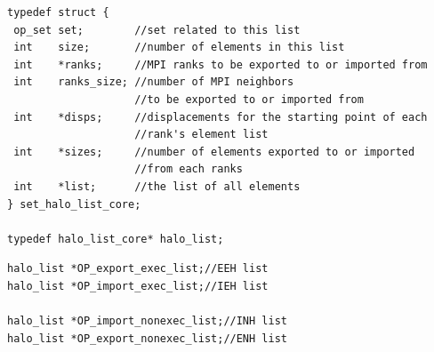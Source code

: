 \documentclass[11pt]{article}
\begin{document}
\begin{verbatim}
typedef struct {
 op_set set;        //set related to this list
 int    size;       //number of elements in this list
 int    *ranks;     //MPI ranks to be exported to or imported from
 int    ranks_size; //number of MPI neighbors
                    //to be exported to or imported from
 int    *disps;     //displacements for the starting point of each
                    //rank's element list
 int    *sizes;     //number of elements exported to or imported
                    //from each ranks
 int    *list;      //the list of all elements
} set_halo_list_core;

typedef halo_list_core* halo_list;
\end{verbatim}
\begin{verbatim}
halo_list *OP_export_exec_list;//EEH list
halo_list *OP_import_exec_list;//IEH list

halo_list *OP_import_nonexec_list;//INH list
halo_list *OP_export_nonexec_list;//ENH list
\end{verbatim}
\end{document}

